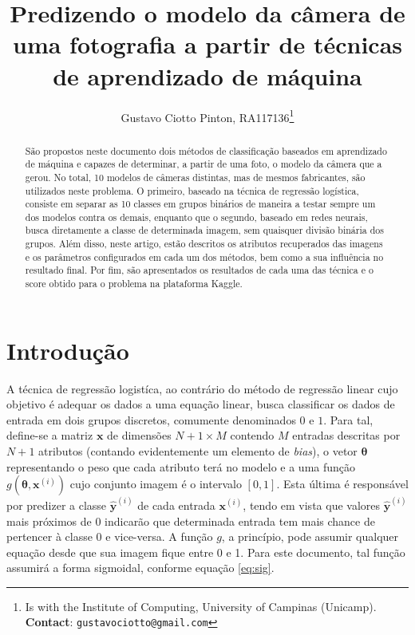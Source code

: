 \documentclass[10pt,twocolumn,letterpaper]{article}
\begin{document}
\title {Predizendo o modelo da câmera de uma fotografia a partir de técnicas de aprendizado de máquina}
\author{Gustavo Ciotto Pinton, RA117136\thanks{Is with the Institute of Computing, University of Campinas (Unicamp). \textbf{Contact}: \tt\small{gustavociotto@gmail.com}}}

\maketitle
\begin{abstract}
São propostos neste documento dois métodos de classificação baseados em aprendizado de máquina e capazes de determinar, a partir de uma foto, o modelo da câmera que a gerou. No total, 10 modelos de câmeras distintas, mas de mesmos fabricantes, são utilizados neste problema. O primeiro, baseado na técnica de regressão logística, consiste em separar as 10 classes em grupos binários de maneira a testar sempre um dos modelos contra os demais, enquanto que o segundo, baseado em redes neurais, busca diretamente a classe de determinada imagem, sem quaisquer divisão binária dos grupos. Além disso, neste artigo, estão descritos os atributos recuperados das imagens e os parâmetros configurados em cada um dos métodos, bem como a sua influência no resultado final. Por fim, são apresentados os resultados de cada uma das técnica e o score obtido para o problema na plataforma Kaggle.
\end{abstract}

\section{Introdução}
\label{intro}

A técnica de regressão logistíca, ao contrário do método de regressão linear cujo objetivo é adequar os dados a uma equação linear, busca classificar os dados de entrada em dois grupos discretos, comumente denominados \(0\) e \(1\). Para tal, define-se a matriz \(\bm{x}\) de dimensões \(N + 1 \times M\)  contendo \(M\) entradas descritas por \(N + 1\) atributos (contando evidentemente um elemento de \textit{bias}), o vetor \(\bm{\theta}\) representando o peso que cada atributo terá no modelo e a uma função \(g\left(\bm{\theta}, \bm{x}^{(i)}\right)\) cujo conjunto imagem é o intervalo \([0,1]\). Esta última é responsável por predizer a classe \(\bm{\hat{y}}^{(i)}\) de cada entrada \(\bm{x}^{(i)}\), tendo em vista que valores \(\bm{\hat{y}}^{(i)}\) mais próximos de 0 indicarão que determinada entrada tem mais chance de pertencer à classe 0 e vice-versa. A função \(g\), a princípio, pode assumir qualquer equação desde que sua imagem fique entre 0 e 1. Para este documento, tal função assumirá a forma sigmoidal, conforme equação \ref{eq:sig}.
\end{document}
